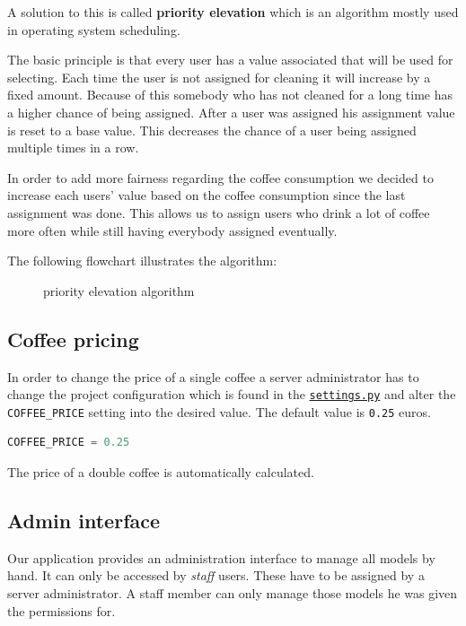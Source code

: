 A solution to this is called \textbf{priority elevation} which is an
algorithm mostly used in operating system scheduling.

The basic principle is that every user has a value associated that will
be used for selecting. Each time the user is not assigned for cleaning
it will increase by a fixed amount. Because of this somebody who has not
cleaned for a long time has a higher chance of being assigned. After a
user was assigned his assignment value is reset to a base value. This
decreases the chance of a user being assigned multiple times in a row.

In order to add more fairness regarding the coffee consumption we
decided to increase each users' value based on the coffee consumption
since the last assignment was done. This allows us to assign users who
drink a lot of coffee more often while still having everybody assigned
eventually.

The following flowchart illustrates the algorithm:

\begin{figure}[htbp]
\centering
{}
\caption{priority elevation algorithm}
\end{figure}

\subsection{Coffee pricing}\label{coffee-pricing}

In order to change the price of a single coffee a server administrator
has to change the project configuration which is found in the
\href{../../server/server/settings.py}{\texttt{settings.py}} and alter
the \texttt{COFFEE\_PRICE} setting into the desired value. The default
value is \texttt{0.25} euros.

\begin{lstlisting}[language=python]
COFFEE_PRICE = 0.25
\end{lstlisting}

The price of a double coffee is automatically calculated.

\subsection{Admin interface}\label{admin-interface}

Our application provides an administration interface to manage all
models by hand. It can only be accessed by \emph{staff} users. These
have to be assigned by a server administrator. A staff member can only
manage those models he was given the permissions for.

